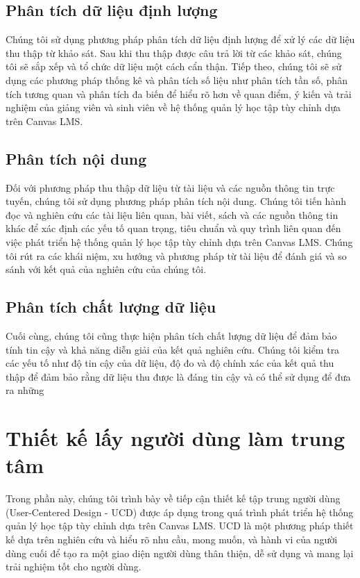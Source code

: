 \documentclass[../Thesis.tex]{subfiles}
\begin{document}
    \subsection{Phân tích dữ liệu định lượng}
    Chúng tôi sử dụng phương pháp phân tích dữ liệu định lượng để xử lý các dữ liệu thu thập từ khảo sát. Sau khi thu thập được câu trả lời từ các khảo sát, chúng tôi sẽ sắp xếp và tổ chức dữ liệu một cách cẩn thận. Tiếp theo, chúng tôi sẽ sử dụng các phương pháp thống kê và phân tích số liệu như phân tích tần số, phân tích tương quan và phân tích đa biến để hiểu rõ hơn về quan điểm, ý kiến và trải nghiệm của giảng viên và sinh viên về hệ thống quản lý học tập tùy chỉnh dựa trên Canvas LMS.
    \subsection{Phân tích nội dung}
    Đối với phương pháp thu thập dữ liệu từ tài liệu và các nguồn thông tin trực tuyến, chúng tôi sử dụng phương pháp phân tích nội dung. Chúng tôi tiến hành đọc và nghiên cứu các tài liệu liên quan, bài viết, sách và các nguồn thông tin khác để xác định các yếu tố quan trọng, tiêu chuẩn và quy trình liên quan đến việc phát triển hệ thống quản lý học tập tùy chỉnh dựa trên Canvas LMS. Chúng tôi rút ra các khái niệm, xu hướng và phương pháp từ tài liệu để đánh giá và so sánh với kết quả của nghiên cứu của chúng tôi.
    \subsection{Phân tích chất lượng dữ liệu}
    Cuối cùng, chúng tôi cũng thực hiện phân tích chất lượng dữ liệu để đảm bảo tính tin cậy và khả năng diễn giải của kết quả nghiên cứu. Chúng tôi kiểm tra các yếu tố như độ tin cậy của dữ liệu, độ đo và độ chính xác của kết quả thu thập để đảm bảo rằng dữ liệu thu được là đáng tin cậy và có thể sử dụng để đưa ra những
\section{Thiết kế lấy người dùng làm trung tâm}
Trong phần này, chúng tôi trình bày về tiếp cận thiết kế tập trung người dùng (User-Centered Design - UCD) được áp dụng trong quá trình phát triển hệ thống quản lý học tập tùy chỉnh dựa trên Canvas LMS. UCD là một phương pháp thiết kế dựa trên nghiên cứu và hiểu rõ nhu cầu, mong muốn, và hành vi của người dùng cuối để tạo ra một giao diện người dùng thân thiện, dễ sử dụng và mang lại trải nghiệm tốt cho người dùng.
\end{document}
